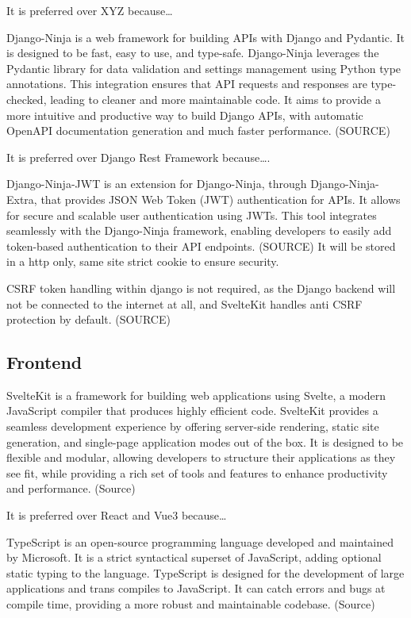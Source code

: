 It is preferred over XYZ because…

Django-Ninja is a web framework for building APIs with Django and Pydantic. It is designed to be fast, easy to use, and type-safe. Django-Ninja leverages the Pydantic library for data validation and settings management using Python type annotations. This integration ensures that API requests and responses are type-checked, leading to cleaner and more maintainable code. It aims to provide a more intuitive and productive way to build Django APIs, with automatic OpenAPI documentation generation and much faster performance. (SOURCE)

It is preferred over Django Rest Framework because….

Django-Ninja-JWT is an extension for Django-Ninja, through Django-Ninja-Extra, that provides JSON Web Token (JWT) authentication for APIs. It allows for secure and scalable user authentication using JWTs. This tool integrates seamlessly with the Django-Ninja framework, enabling developers to easily add token-based authentication to their API endpoints. (SOURCE) It will be stored in a http only, same site strict cookie to ensure security. 

CSRF token handling within django is not required, as the Django backend will not be connected to the internet at all, and SvelteKit handles anti CSRF protection by default. (SOURCE)

\subsection{Frontend}
SvelteKit is a framework for building web applications using Svelte, a modern JavaScript compiler that produces highly efficient code. SvelteKit provides a seamless development experience by offering server-side rendering, static site generation, and single-page application modes out of the box. It is designed to be flexible and modular, allowing developers to structure their applications as they see fit, while providing a rich set of tools and features to enhance productivity and performance. (Source)

It is preferred over React and Vue3 because…

TypeScript is an open-source programming language developed and maintained by Microsoft. It is a strict syntactical superset of JavaScript, adding optional static typing to the language. TypeScript is designed for the development of large applications and trans compiles to JavaScript. It can catch errors and bugs at compile time, providing a more robust and maintainable codebase. (Source)


